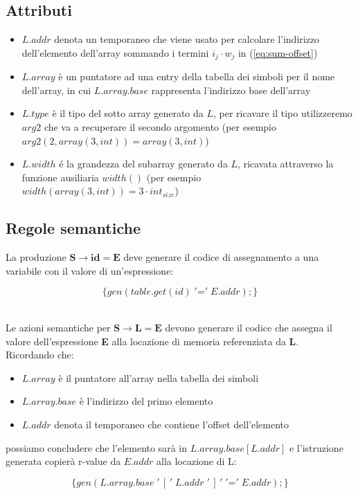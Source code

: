 \documentclass[11pt]{article}
\begin{document}
\subsection{Attributi}
\begin{itemize}
  \item $L.addr$ denota un temporaneo che viene usato per calcolare l'indirizzo
  dell'elemento dell'array sommando i termini $i_j \cdot w_j$ in (\ref{eq:sum-offset})
  \item $L.array$ è un puntatore ad una entry della tabella dei simboli per il
  nome dell'array, in cui $L.array.base$ rappresenta l'indirizzo base dell'array
  \item $L.type$ è il tipo del sotto array generato da $L$, per ricavare il tipo
  utilizzeremo $arg2$ che va a recuperare il secondo argomento (per esempio 
  $arg2(2, array(3, int))=array(3, int)$)
  \item $L.width$ é la grandezza del subarray generato da $L$, ricavata attraverso 
  la funzione ausiliaria $width()$ (per esempio $width(array(3, int)) = 3 \cdot int_{size}$) 
\end{itemize}
\subsection{Regole semantiche}
La produzione $\mathbf{S \rightarrow id = E}$ deve generare il codice di assegnamento a 
una variabile con il valore di un'espressione: 
\begin{tcolorbox}[colframe=black!10!black, colback=black!10!white]
$$\{gen(table.get(id) \;'\mathord{=}'\; E.addr);\}$$
\end{tcolorbox}
\noindent 
\\ Le azioni semantiche per $\mathbf{S \rightarrow L=E}$ devono generare il codice che assegna
il valore dell'espressione \textbf{E} alla locazione di memoria referenziata da \textbf{L}. 
\\Ricordando che: 
\begin{itemize}
  \item $L.array$ è il puntatore all'array nella tabella dei simboli
  \item $L.array.base$ è l'indirizzo del primo elemento
  \item $L.addr$ denota il temporaneo che contiene l'offset dell'elemento
\end{itemize}
possiamo concludere che l'elemento sarà in $L.array.base[L.addr]$ e l'istruzione generata 
copierà r-value da $E.addr$ alla locazione di L:
\begin{tcolorbox}[colframe=black!10!black, colback=black!10!white]
$$\{gen(L.array.base\;'\,[\,'\;L.addr\;'\,]\,'\;'\mathord{=}'\; E.addr);\}$$
\end{tcolorbox}
\end{document}
